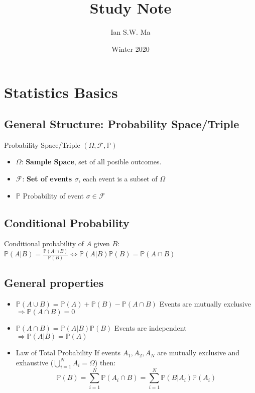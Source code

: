 \documentclass[12pt]{article}
\title{\coursename\\Study Note}
\author{Ian S.W. Ma}
\date{Winter 2020}
\theoremstyle{definition}
\newcommand{\Prob}[1]{\mathbb{P}(#1)}
\begin{document}
\maketitle
\tableofcontents
\newpage

\setcounter{page}{1}

\section{Statistics Basics}
    \subsection*{General Structure: Probability Space/Triple}
    Probability Space/Triple $(\Omega, \mathcal{F}, \mathbb{P})$
    \begin{itemize}
        \item $\Omega$: \textbf{Sample Space}, set of all posible outcomes.
        \item $\mathcal{F}$: \textbf{Set of events \(\sigma\)}, each event is a subset of $\Omega$
        \item $\mathbb{P}$ Probability of event $\sigma \in \mathcal{F}$
    \end{itemize}
    \subsection*{Conditional Probability}
    Conditional probability of $A$ given $B$: $\Prob{A|B} = \frac{\Prob{A \cap B}}{\Prob{B}} \Leftrightarrow \Prob{A|B}\Prob{B} = \Prob{A \cap B}$
    \subsection*{General properties}
    \begin{itemize}
        \item $\Prob{A \cup B} = \Prob{A} + \Prob{B} - \Prob{A \cap B}$
            \subitem Events are mutually exclusive $\Rightarrow \Prob{A \cap B} = 0$
        \item $\Prob{A \cap B} = \Prob{A|B}\Prob{B}$
            \subitem Events are independent $\Rightarrow \Prob{A|B} = \Prob{A}$
        \item Law of Total Probability
            \subitem If events $A_1, A_2, A_N$ are mutually exclusive and exhaustive ($\bigcup_{i = 1}^N A_i = \Omega$) then:
            $$\Prob{B} = \sum_{i=1}^N \Prob{A_i \cap B} = \sum_{i=1}^N \Prob{B|A_i}\Prob{A_i}$$
    \end{itemize}
\end{document}
